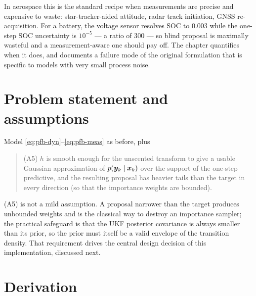 In aerospace this is the standard recipe when measurements are precise and expensive to waste:
star-tracker-aided attitude, radar track initiation, GNSS re-acquisition.  For a battery, the
voltage sensor resolves SOC to \num{0.003} while the one-step SOC uncertainty is $10^{-5}$ --- a
ratio of \num{300} --- so blind proposal is maximally wasteful and a measurement-aware one should
pay off.  The chapter quantifies when it does, and documents a failure mode of the original
formulation that is specific to models with very small process noise.

\section{Problem statement and assumptions}
Model \eqref{eq:pfb-dyn}--\eqref{eq:pfb-meas} as before, plus
\begin{quote}
(A5) $h$ is smooth enough for the unscented transform to give a usable Gaussian approximation of
$p(\bm{y}_k\mid\bm{x}_k)$ over the support of the one-step predictive, and the resulting proposal has
heavier tails than the target in every direction (so that the importance weights are bounded).
\end{quote}
(A5) is not a mild assumption.  A proposal narrower than the target produces unbounded weights and
is the classical way to destroy an importance sampler; the practical safeguard is that the UKF
posterior covariance is always smaller than its prior, so the prior must itself be a valid
envelope of the transition density.  That requirement drives the central design decision of this
implementation, discussed next.

\section{Derivation}

